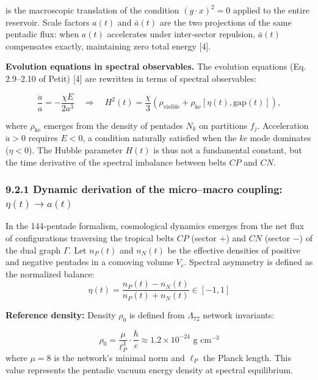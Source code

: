 \documentclass[11pt]{article}
\begin{document}
is the macroscopic translation of the condition \((g\cdot x)^2=0\)
applied to the entire reservoir. Scale factors \(a(t)\) and
\(\bar{a}(t)\) are the two projections of the same pentadic flux: when
\(a(t)\) accelerates under inter‑sector repulsion, \(\bar{a}(t)\)
compensates exactly, maintaining zero total energy {[}4{]}.

\textbf{Evolution equations in spectral observables.} The evolution
equations (Eq. 2.9--2.10 of Petit) {[}4{]} are rewritten in terms of
spectral observables:

\[
\frac{\ddot{a}}{a} = -\frac{\chi E}{2 a^3} \quad \Rightarrow \quad H^2(t) = \frac{\chi}{3} \left( \rho_{\text{visible}} + \rho_{\text{ke}}[\eta(t), \text{gap}(t)] \right),
\]

where \(\rho_{\text{ke}}\) emerges from the density of pentades \(N_k\)
on partitions \(f_j\). Acceleration \(\ddot{a} > 0\) requires \(E < 0\),
a condition naturally satisfied when the \textit{ke} mode dominates
(\(\eta < 0\)). The Hubble parameter \(H(t)\) is thus not a fundamental
constant, but the time derivative of the spectral imbalance between
belts \(CP\) and \(CN\).

\hypertarget{dynamic-derivation-of-the-micromacro-coupling-etat-to-at}{%
\subsubsection{\texorpdfstring{9.2.1 Dynamic derivation of the
micro--macro coupling:
\(\eta(t) \to a(t)\)}{9.2.1 Dynamic derivation of the micro--macro coupling: \textbackslash eta(t) \textbackslash to a(t)}}\label{dynamic-derivation-of-the-micromacro-coupling-etat-to-at}}

In the 144-pentade formalism, cosmological dynamics emerges from the net
flux of configurations traversing the tropical belts \(CP\) (sector
\(+\)) and \(CN\) (sector \(-\)) of the dual graph \(\Gamma\). Let
\(n_P(t)\) and \(n_N(t)\) be the effective densities of positive and
negative pentades in a comoving volume \(V_c\). Spectral asymmetry is
defined as the normalized balance: \[
\eta(t) = \frac{n_P(t) - n_N(t)}{n_P(t) + n_N(t)} \in [-1, 1]
\]

\textbf{Reference density:} Density \(\rho_0\) is defined from
\(\Lambda_{72}\) network invariants:

\[
\rho_0 = \frac{\mu}{\ell_P^3} \cdot \frac{\hbar}{c} \approx 1.2 \times 10^{-24} \text{ g cm}^{-3}
\] where \(\mu = 8\) is the network's minimal norm and \(\ell_P\) the
Planck length. This value represents the pentadic vacuum energy density
at spectral equilibrium.
\end{document}
